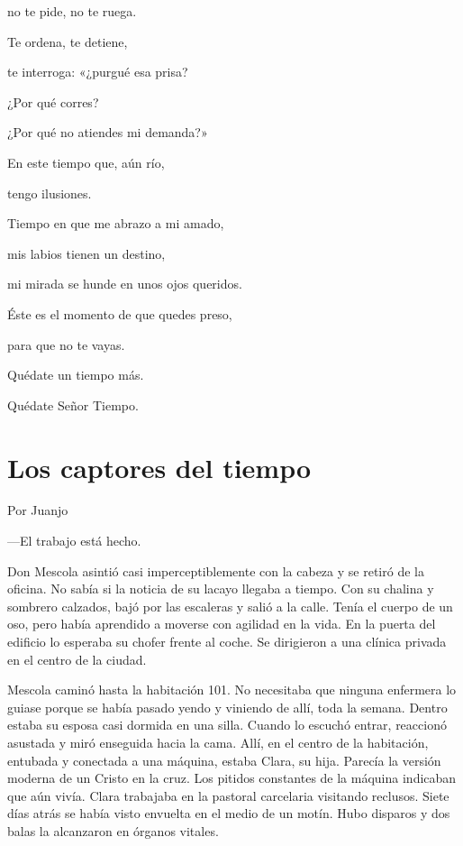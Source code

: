 \documentclass[11pt,twoside,openright,a5paper]{book}
\begin{document}
\begin{center}
no te pide, no te ruega.

\vspace{0.5cm}

Te ordena, te detiene, 

te interroga: «¿purgué esa prisa?  

¿Por qué corres?

¿Por qué no atiendes mi demanda?»

\vspace{0.5cm}

En este tiempo que, aún río, 

tengo ilusiones.

Tiempo en que me abrazo a mi amado,

mis labios tienen un destino,

mi mirada se hunde en unos ojos queridos.

\vspace{0.5cm}

Éste es el momento de que quedes preso,

para que no te vayas.

Quédate un tiempo más.

Quédate Señor Tiempo.
\end{center}

\clearpage
\section*{Los captores del tiempo}
                                                                               \begin{flushright}Por Juanjo\end{flushright}

---El trabajo está hecho.

Don Mescola asintió casi imperceptiblemente con la cabeza y se retiró de la oficina. No sabía si la noticia de su lacayo llegaba a tiempo. Con su chalina y sombrero calzados, bajó por las escaleras y salió a la calle. Tenía el cuerpo de un oso, pero había aprendido a moverse con agilidad en la vida. En la puerta del edificio lo esperaba su chofer frente al coche. Se dirigieron a una clínica privada en el centro de la ciudad.

Mescola caminó hasta la habitación 101. No necesitaba que ninguna enfermera lo guiase porque se había pasado yendo y viniendo de allí, toda la semana. Dentro estaba su esposa casi dormida en una silla. Cuando lo escuchó entrar, reaccionó asustada y miró enseguida hacia la cama. Allí, en el centro de la habitación, entubada y conectada a una máquina, estaba Clara, su hija. Parecía la versión moderna de un Cristo en la cruz. Los pitidos constantes de la máquina indicaban que aún vivía. Clara trabajaba en la pastoral carcelaria visitando reclusos. Siete días atrás se había visto envuelta en el medio de un motín. Hubo disparos y dos balas la alcanzaron en órganos vitales.
\end{document}
